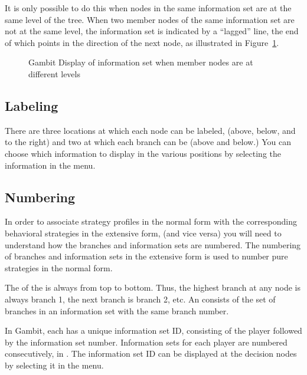 \documentclass[12pt]{report}
\begin{document}
It is only possible to do
this when nodes in the same information set are at the same level of
the tree.  When two member nodes of the same information set are not
at the same level, the information set is indicated by a ``lagged''
line, the end of which points in the direction of the next node, as
illustrated in Figure~\ref{fig_lag_iset}.

\begin{figure}\label{fig_lag_iset}
\caption{Gambit Display of information set when member nodes are at different levels}\label{fig_lag_iset}
\end{figure}

\subsection{Labeling}
There are three locations at which each node can be labeled, (above,
below, and to the right) and two at which each branch can be
 (above and below.) You can choose which
information to display in the various positions by selecting the
information in the  menu.

\subsection{Numbering}\label{infosetnumbering}
In order  to associate strategy profiles in the 
normal form with the corresponding behavioral strategies in the extensive 
form, (and vice versa) you will need to understand how the branches and 
information sets are numbered.  The numbering of branches and information 
sets in the extensive form  is used to number pure strategies in the normal form.  

The  of the  is always
from top to bottom.  Thus, the highest branch at any node is always branch
1, the next branch is branch 2, etc. An  consists of 
the set of branches in an information set with the same branch number.  

In Gambit, each  has a unique 
information set ID, consisting of the player followed by the information 
set number.  Information sets for each player are numbered consecutively, 
in .  
The information set ID can be displayed at the decision nodes by selecting 
it in the  menu.  
\end{document}
